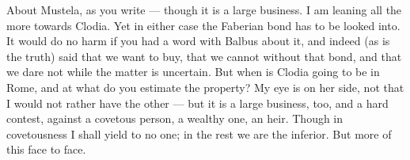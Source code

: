 

 About Mustela, as you write --- though it is a large business. I am leaning all the more towards Clodia. Yet in either case the Faberian bond has to be looked into. It would do no harm if you had a word with Balbus about it, and indeed (as is the truth) said that we want to buy, that we cannot without that bond, and that we dare not while the matter is uncertain. But when is Clodia going to be in Rome, and at what do you estimate the property? My eye is on her side, not that I would not rather have the other --- but it is a large business, too, and a hard contest, against a covetous person, a wealthy one, an heir. Though in covetousness I shall yield to no one; in the rest we are the inferior. But more of this face to face.
